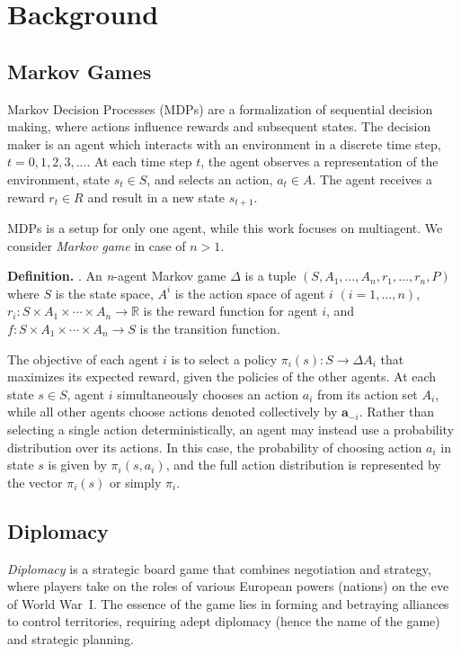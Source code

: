 \documentclass[oneside]{memoir}
\begin{document}
%
%

\chapter{Background}
\label{ch:background}
\section{Markov Games}
Markov Decision Processes (MDPs) are a formalization of sequential decision making, where actions influence rewards and subsequent states. The decision maker is an agent which interacts with an environment in a discrete time step, $t = 0,1,2,3, ...$. At each time step $t$, the agent observes a representation of the environment, state $s_t \in S$, and selects an action, $a_t \in A$. The agent receives a reward $r_t \in R$ and result in a new state $s_{t+1}$. 

MDPs is a setup for only one agent, while this work focuses on multiagent. We consider \textit{Markov game} \citep{Shapley1953StochasticG} in case of $n>1$.

\textbf{Definition.} \citep{bakhtin2023mastering}. An \textit{n}-agent Markov game $\Delta$ is a tuple $(S, A_1, \ldots, A_n, r_1, \ldots, r_n, P)$ where $S$ is the state space, $A^i$ is the action space of agent $i$ $(i = 1, \ldots, n)$, $r_i: S \times A_1 \times \cdots \times A_n \rightarrow \mathbb{R}$ is the reward function for agent $i$, and $f: S \times A_1 \times \cdots \times A_n \rightarrow S$ is the transition function.

The objective of each agent $i$ is to select a policy $\pi_i(s) : S \rightarrow \Delta A_i$ that maximizes its expected reward, given the policies of the other agents. At each state $s \in S$, agent $i$ simultaneously chooses an action $a_i$ from its action set $A_i$, while all other agents choose actions denoted collectively by $\mathbf{a}_{-i}$. Rather than selecting a single action deterministically, an agent may instead use a probability distribution over its actions. In this case, the probability of choosing action $a_i$ in state $s$ is given by $\pi_i(s, a_i)$, and the full action distribution is represented by the vector $\pi_i(s)$ or simply $\pi_i$.

\section{Diplomacy}
\label{sec:diplomacy}
\textit{Diplomacy} is a strategic board game that combines negotiation
and strategy, where players take on the roles of various European
powers (nations) on the eve of World War~I.
%
The essence of the game lies in forming and betraying alliances to
control territories, requiring adept diplomacy (hence the name of the game) and strategic planning.
\end{document}
